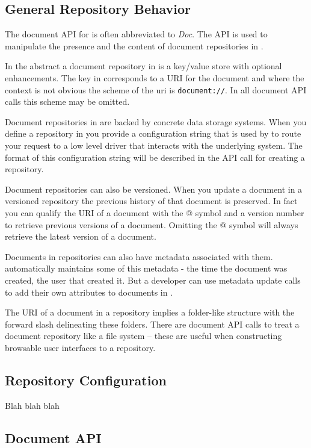 \subsection{General Repository Behavior}
The document API for \Rapture is often abbreviated to \emph{Doc}. The API is used
to manipulate the presence and the content of document repositories in \Rapture.

In the abstract a document repository in \Rapture is a key/value store with optional
enhancements. The key in \Rapture corresponds to a URI for the document and where the
context is not obvious the scheme of the uri is \verb+document://+. In all document
API calls this scheme may be omitted.

Document repositories in \Rapture are backed by concrete data storage systems. When
you define a repository in \Rapture you provide a configuration string that is used
by \Rapture to route your request to a low level driver that interacts with the
underlying system. The format of this configuration string will be described in
the API call for creating a repository.

Document repositories can also be versioned. When you update a document in a
versioned repository the previous history of that document is preserved. In fact you can
qualify the URI of a document with the @ symbol and a version number to retrieve
previous versions of a document. Omitting the @ symbol will always retrieve the
latest version of a document.

Documents in repositories can also have metadata associated with them. \Rapture
automatically maintains some of this metadata - the time the document was created, the
user that created it. But a developer can use metadata update calls to add their
own attributes to documents in \Rapture.

The URI of a document in a repository implies a folder-like structure with the
forward slash delineating these folders. There are document API calls to treat a
document repository like a file system -- these are useful when constructing
browsable user interfaces to a repository.

\subsection{Repository Configuration}

Blah blah blah

\subsection{Document API}
